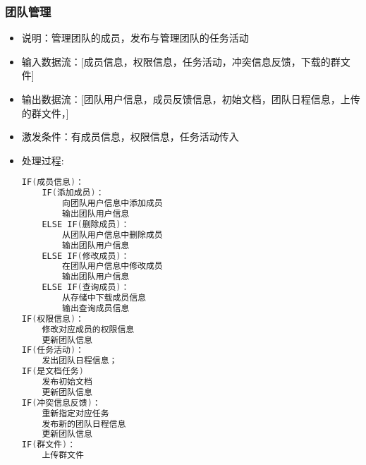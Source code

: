\begin{itemize}
            \subsubsection{团队管理}
            \begin{itemize}
                \item 说明：管理团队的成员，发布与管理团队的任务活动
                \item 输入数据流：[成员信息，权限信息，任务活动，冲突信息反馈，下载的群文件]
                \item 输出数据流：[团队用户信息，成员反馈信息，初始文档，团队日程信息，上传的群文件，]
                \item 激发条件：有成员信息，权限信息，任务活动传入
                \item 处理过程:
\begin{lstlisting}[language=C, caption=团队管理, label={code:first-code}]
IF(成员信息)：
    IF(添加成员)：
        向团队用户信息中添加成员
        输出团队用户信息
    ELSE IF(删除成员)：
        从团队用户信息中删除成员
        输出团队用户信息
    ELSE IF(修改成员)：
        在团队用户信息中修改成员
        输出团队用户信息
    ELSE IF(查询成员)：
        从存储中下载成员信息
        输出查询成员信息
IF(权限信息)：
    修改对应成员的权限信息
    更新团队信息
IF(任务活动)：
    发出团队日程信息；
IF(是文档任务)
    发布初始文档
    更新团队信息
IF(冲突信息反馈)：
    重新指定对应任务
    发布新的团队日程信息
    更新团队信息
IF(群文件)：
    上传群文件
\end{lstlisting}
            \end{itemize}

\end{itemize}
